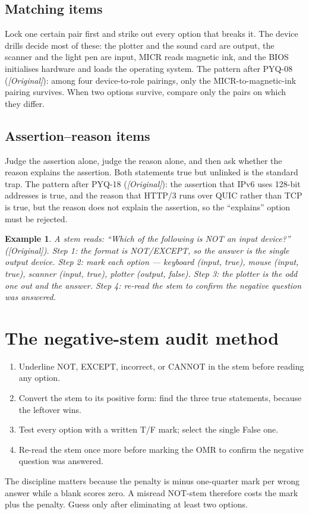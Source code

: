 \documentclass[11pt]{article}
\newtheorem{example}{Example}[section]
\begin{document}
\subsection*{Matching items}
Lock one certain pair first and strike out every option that breaks it. The
device drills decide most of these: the plotter and the sound card are
output, the scanner and the light pen are input, MICR reads magnetic ink, and
the BIOS initialises hardware and loads the operating system. The pattern
after PYQ-08 (\textit{[Original]}): among four device-to-role pairings, only
the MICR-to-magnetic-ink pairing survives. When two options survive, compare
only the pairs on which they differ.

\subsection*{Assertion--reason items}
Judge the assertion alone, judge the reason alone, and then ask whether the
reason explains the assertion. Both statements true but unlinked is the
standard trap. The pattern after PYQ-18 (\textit{[Original]}): the assertion
that IPv6 uses 128-bit addresses is true, and the reason that HTTP/3 runs
over QUIC rather than TCP is true, but the reason does not explain the
assertion, so the ``explains'' option must be rejected.

\begin{example}
A stem reads: ``Which of the following is NOT an input device?''
(\textit{[Original]}). Step 1: the format is NOT/EXCEPT, so the answer is
the single output device. Step 2: mark each option --- keyboard (input,
true), mouse (input, true), scanner (input, true), plotter (output, false).
Step 3: the plotter is the odd one out and the answer. Step 4: re-read the
stem to confirm the negative question was answered.
\end{example}

\section{The negative-stem audit method}
\begin{enumerate}
  \item Underline NOT, EXCEPT, incorrect, or CANNOT in the stem before
    reading any option.
  \item Convert the stem to its positive form: find the three true
    statements, because the leftover wins.
  \item Test every option with a written T/F mark; select the single False
    one.
  \item Re-read the stem once more before marking the OMR to confirm the
    negative question was answered.
\end{enumerate}
The discipline matters because the penalty is minus one-quarter mark per
wrong answer while a blank scores zero. A misread NOT-stem therefore costs
the mark plus the penalty. Guess only after eliminating at least two options.
\end{document}
